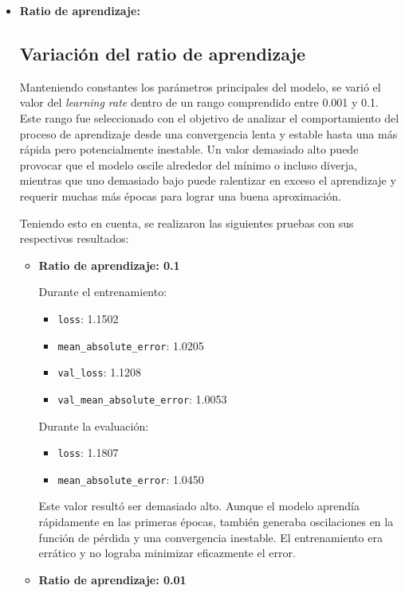 \documentclass[conference,a4paper]{IEEEtran}
\begin{document}
\begin{itemize}
    \item \textbf{Ratio de aprendizaje:}  
    \subsection{Variación del ratio de aprendizaje}

Manteniendo constantes los parámetros principales del modelo, se varió el valor del \textit{learning rate} dentro de un rango comprendido entre 0.001 y 0.1. Este rango fue seleccionado con el objetivo de analizar el comportamiento del proceso de aprendizaje desde una convergencia lenta y estable hasta una más rápida pero potencialmente inestable. Un valor demasiado alto puede provocar que el modelo oscile alrededor del mínimo o incluso diverja, mientras que uno demasiado bajo puede ralentizar en exceso el aprendizaje y requerir muchas más épocas para lograr una buena aproximación.

Teniendo esto en cuenta, se realizaron las siguientes pruebas con sus respectivos resultados:

\begin{itemize}
    \item \textbf{Ratio de aprendizaje: 0.1}
    
    Durante el entrenamiento:
    \begin{itemize}
        \item \texttt{loss}: 1.1502
        \item \texttt{mean\_absolute\_error}: 1.0205
        \item \texttt{val\_loss}: 1.1208
        \item \texttt{val\_mean\_absolute\_error}: 1.0053
    \end{itemize}
    Durante la evaluación:
    \begin{itemize}
        \item \texttt{loss}: 1.1807
        \item \texttt{mean\_absolute\_error}: 1.0450
    \end{itemize}
    
    Este valor resultó ser demasiado alto. Aunque el modelo aprendía rápidamente en las primeras épocas, también generaba oscilaciones en la función de pérdida y una convergencia inestable. El entrenamiento era errático y no lograba minimizar eficazmente el error.

    \item \textbf{Ratio de aprendizaje: 0.01}


\end{itemize}
\end{itemize}
\end{document}
